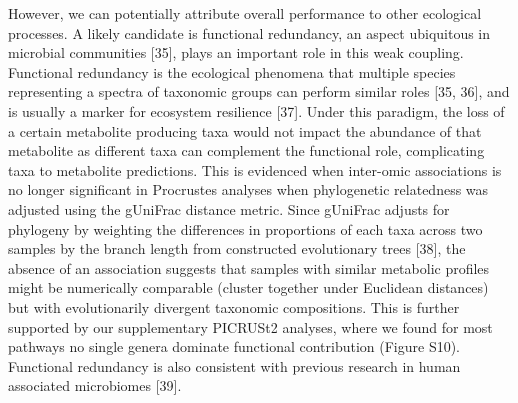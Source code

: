However, we can potentially attribute overall performance to other ecological processes. A likely candidate is functional redundancy, an aspect ubiquitous in microbial communities [35], plays an important role in this weak coupling. Functional redundancy is the ecological phenomena that multiple species representing a spectra of taxonomic groups can perform similar roles [35, 36], and is usually a marker for ecosystem resilience [37]. Under this paradigm, the loss of a certain metabolite producing taxa would not impact the abundance of that metabolite as different taxa can complement the functional role, complicating taxa to metabolite predictions. This is evidenced when inter-omic associations is no longer significant in Procrustes analyses when phylogenetic relatedness was adjusted using the gUniFrac distance metric. Since gUniFrac adjusts for phylogeny by weighting the differences in proportions of each taxa across two samples by the branch length from constructed evolutionary trees [38], the absence of an association suggests that samples with similar metabolic profiles might be numerically comparable (cluster together under Euclidean distances) but with evolutionarily divergent taxonomic compositions. This is further supported by our supplementary PICRUSt2 analyses, where we found for most pathways no single genera dominate functional contribution (Figure S10). Functional redundancy is also consistent with previous research in human associated microbiomes [39]. 
